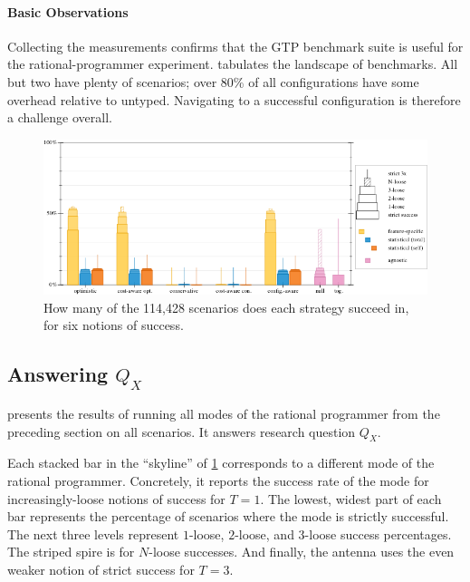 \paragraph{Basic Observations}

Collecting the measurements confirms that the GTP benchmark suite is useful for
the rational-programmer experiment.  tabulates the
landscape of benchmarks.  All but two have plenty of scenarios; over 80\% of all
configurations have some overhead relative to untyped.  Navigating to a
successful configuration is therefore a challenge overall.

\begin{figure}[ht]
  \includegraphics[width=\columnwidth]{data/strategy-overall-feasible.pdf}
  \caption{How many of the 114,428 scenarios does each strategy succeed in, for six notions of success.}
  \label{f:strategy-overall}
\end{figure}

\subsection{Answering $Q_X$} \label{subsec:qx}

 presents the results of running all modes of the
rational programmer from the preceding section on all scenarios. It answers
research question $Q_X$. 

Each stacked bar in the ``skyline'' of \cref{f:strategy-overall} corresponds to
a different mode of the rational programmer. Concretely, it reports the success
rate of the mode for increasingly-loose notions of success for $T = 1$.  The
lowest, widest part of each bar represents the percentage of scenarios where the
mode is strictly successful. The next three levels represent $1$-loose,
$2$-loose, and $3$-loose success percentages.  The striped spire is for
$N$-loose successes.  And finally, the antenna uses the even weaker notion of
strict success for $T = 3$.

